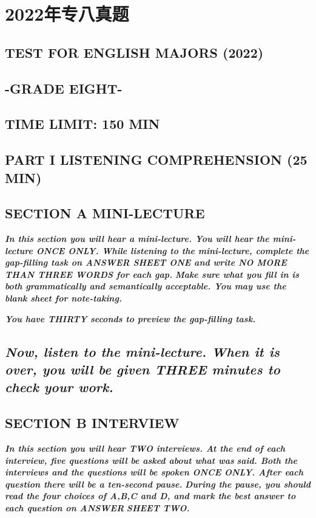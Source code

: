 \documentclass[UTF8,11pt]{ctexart}
\begin{document}
\section*{2022年专八真题}
\subsection*{\textbf{TEST} \textbf{FOR} \textbf{ENGLISH} \textbf{MAJORS (2022)}}


\subsection*{\textbf{-GRADE EIGHT-}}


\subsection*{\textbf{TIME LIMIT: 150 MIN}}


\subsection*{\textbf{PART I LISTENING COMPREHENSION (25 MIN})}


\subsection*{\textbf{SECTION A MINI-LECTURE}}


\textbf{\textit{In this section you will hear a mini-lecture. You will hear the mini-lecture ONCE ONLY. While listening to the mini-lecture, complete the gap-filling task on ANSWER SHEET ONE and write NO MORE THAN THREE WORDS for each gap.}} \textbf{\textit{Make sure what you fill in is both grammatically and semantically acceptable. You may use the blank sheet for note-taking.}}


\textbf{\textit{You have THIRTY seconds to preview the gap-filling task.}}


\subsection*{\textbf{\textit{Now, listen to the mini-lecture. When it is over, you will be given THREE minutes to check your work.}}}


\subsection*{\textbf{SECTION B INTERVIEW}}


\textbf{\textit{In this section you will hear TWO interviews. At the end of each interview, five questions will be asked about what was}} \textbf{\textit{said. Both the interviews and the questions will be spoken ONCE ONLY. After each question there will be a ten-second pause.}} \textbf{\textit{During the pause, you should read the four choices of A,B,C and D, and mark the best answer to each question on ANSWER}} \textbf{\textit{SHEET TWO.}}
\end{document}
